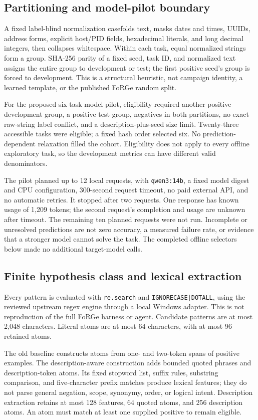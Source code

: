 \documentclass[10pt,twocolumn,letterpaper]{article}
\begin{document}
\subsection{Partitioning and model-pilot boundary}
A fixed label-blind normalization casefolds text, masks dates and times, UUIDs, address forms, explicit host/PID fields, hexadecimal literals, and long decimal integers, then collapses whitespace. Within each task, equal normalized strings form a group. SHA-256 parity of a fixed seed, task ID, and normalized text assigns the entire group to development or test; the first positive seed's group is forced to development. This is a structural heuristic, not campaign identity, a learned template, or the published FoRGe random split.

For the proposed six-task model pilot, eligibility required another positive development group, a positive test group, negatives in both partitions, no exact raw-string label conflict, and a description-plus-seed size limit. Twenty-three accessible tasks were eligible; a fixed hash order selected six. No prediction-dependent relaxation filled the cohort. Eligibility does not apply to every offline exploratory task, so the development metrics can have different valid denominators.

The pilot planned up to 12 local requests, with \texttt{qwen3:14b}, a fixed model digest and CPU configuration, 300-second request timeout, no paid external API, and no automatic retries. It stopped after two requests. One response has known usage of 1,209 tokens; the second request's completion and usage are unknown after timeout. The remaining ten planned requests were not run. Incomplete or unresolved predictions are not zero accuracy, a measured failure rate, or evidence that a stronger model cannot solve the task. The completed offline selectors below made no additional target-model calls.

\subsection{Finite hypothesis class and lexical extraction}
Every pattern is evaluated with \texttt{re.search} and \texttt{IGNORECASE|DOTALL}, using the reviewed upstream regex engine through a local Windows adapter. This is not reproduction of the full FoRGe harness or agent. Candidate patterns are at most 2,048 characters. Literal atoms are at most 64 characters, with at most 96 retained atoms.

The old baseline constructs atoms from one- and two-token spans of positive examples. The description-aware construction adds bounded quoted phrases and description-token atoms. Its fixed stopword list, suffix rules, substring comparison, and five-character prefix matches produce lexical features; they do not parse general negation, scope, synonymy, order, or logical intent. Description extraction retains at most 128 features, 64 quoted atoms, and 256 description atoms. An atom must match at least one supplied positive to remain eligible.
\end{document}
